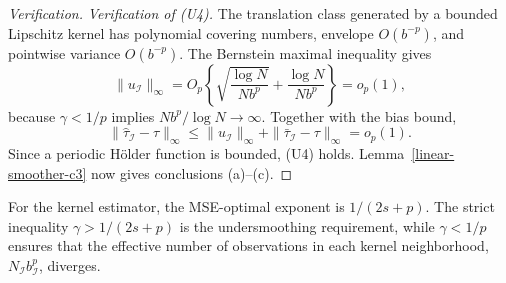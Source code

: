 \documentclass[11pt]{article}
\theoremstyle{referenceplain}
\theoremstyle{referencedefinition}
\theoremstyle{referenceremark}
\begin{document}
\begin{proof}[Verification]
\medskip\noindent\textit{Verification of (U4).}
The translation class generated by a bounded Lipschitz kernel has polynomial covering numbers, envelope $O(b^{-p})$, and pointwise variance $O(b^{-p})$. The Bernstein maximal inequality gives
\[
\|u_{\mathcal I}\|_\infty
=O_p\left\{
\sqrt{\frac{\log N}{Nb^p}}
+\frac{\log N}{Nb^p}\right\}=o_p(1),
\]
because $\gamma<1/p$ implies $Nb^p/\log N\to\infty$. Together with the bias bound,
\[
\|\widehat\tau_{\mathcal I}-\tau\|_\infty
\le\|u_{\mathcal I}\|_\infty
+\|\bar\tau_{\mathcal I}-\tau\|_\infty=o_p(1).
\]
Since a periodic H\"older function is bounded, (U4) holds. Lemma~\ref{linear-smoother-c3} now gives conclusions (a)--(c).
\end{proof}

For the kernel estimator, the MSE-optimal exponent is
$1/(2s+p)$. The strict inequality $\gamma>1/(2s+p)$ is the undersmoothing requirement, while $\gamma<1/p$ ensures that the effective number of observations in each kernel neighborhood, $N_{\mathcal I}b_{\mathcal I}^p$, diverges.
\end{document}
